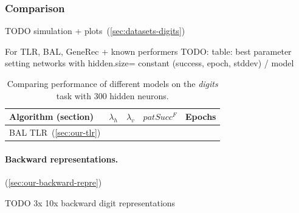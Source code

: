 \subsubsection{Comparison} 
\label{sec:results-cmp-digits} 
TODO simulation + plots~(\ref{sec:datasets-digits}) 

For TLR, BAL, GeneRec + known performers 
TODO: table: best parameter setting networks with hidden.size= constant (success, epoch, stddev) / model \\

\begin{table}[H] 
  \centering
    \begin{tabular}{|l|l|l|l|l|}
    \hline
    Algorithm (section)&$\lambda_h$&$\lambda_v$&$patSucc^F$ &Epochs\\ %
    \hline
    BAL TLR~(\ref{sec:our-tlr})& & & & \\ %
    \hline 
    \end{tabular}
  \caption{Comparing performance of different models on the \emph{digits} task with 300 hidden neurons.} 
  \label{tab:results-cmp-digits}
\end{table}

\paragraph{Backward representations.} 
(\ref{sec:our-backward-repre}) 

TODO 3x 10x backward digit representations 

